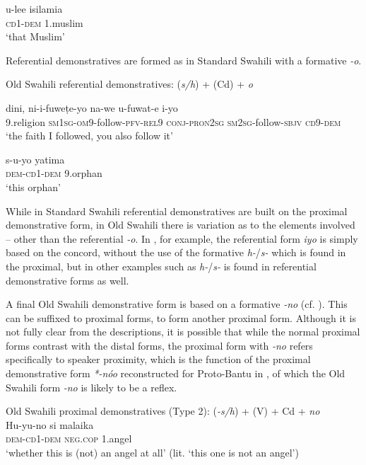 \documentclass[output=paper]{langscibook}
\begin{document}
    \ex\label{ex:marten:15b} \gll  u-lee        isilamia\\
    \textsc{cd}1-\textsc{dem}    1.muslim\\
    \glt ‘that Muslim’ \citep[138]{Miehe1979}
    \z
\z

Referential demonstratives are formed as in Standard Swahili with a formative \textit{{}-o}.

\ea\label{ex:marten:16}
Old Swahili referential demonstratives: (\textit{s/h}) + (Cd) + \textit{o}~ 

    \ea\label{ex:marten:16a} \gll  dini,       ni-i-fuweṭe-yo             na-we  u-fuwat-e         i-yo\\
    9.religion  \textsc{sm1sg}{}-\textsc{om9}{}-follow-\textsc{pfv-rel9}    \textsc{conj-pron2sg} \textsc{sm2sg}{}-follow-\textsc{sbjv}  \textsc{cd9-dem}\\
    \glt ‘the faith I followed, you also follow it’ \citep[140]{Miehe1979}


    \ex\label{ex:marten:16b} \gll  s-u-yo        yatima\\
    \textsc{dem}{}-\textsc{cd}1-\textsc{dem}    9.orphan\\
     \glt ‘this orphan’ \citep[144]{Miehe1979}
     \z
\z

While in Standard Swahili referential demonstratives are built on the proximal demonstrative form, in Old Swahili there is variation as to the elements involved -- other than the referential \textit{{}-o}. In , for example, the referential form \textit{iyo} is simply based on the concord, without the use of the formative \textit{h-}/\textit{s-} which is found in the proximal, but in other examples such as  \textit{h-}/\textit{s-} is found in referential demonstrative forms as well. 

  A final Old Swahili demonstrative form is based on a formative \textit{{}-no} (cf. \citealt{Nicolle2012}). This can be suffixed to proximal forms, to form another proximal form. Although it is not fully clear from the descriptions, it is possible that while the normal proximal forms contrast with the distal forms, the proximal form with \textit{{}-no} refers specifically to speaker proximity, which is the function of the proximal demonstrative form \textit{*-nóo} reconstructed for Proto-Bantu in \citet[107]{Meeussen1967}, of which the Old Swahili form \textit{{}-no} is likely to be a reflex. 

\ea\label{ex:marten:17}
Old Swahili proximal demonstratives (Type 2): (\textit{{}-s/h}) + (V) + Cd + \textit{no}\\
\gll Hu-yu-no       si         malaika \\
\textsc{dem-cd1-dem}    \textsc{neg.cop}    1.angel\\
\glt ‘whether this is (not) an angel at all’ (lit. ‘this one is not an angel’) \citep[146]{Miehe1979}
\z
\end{document}
